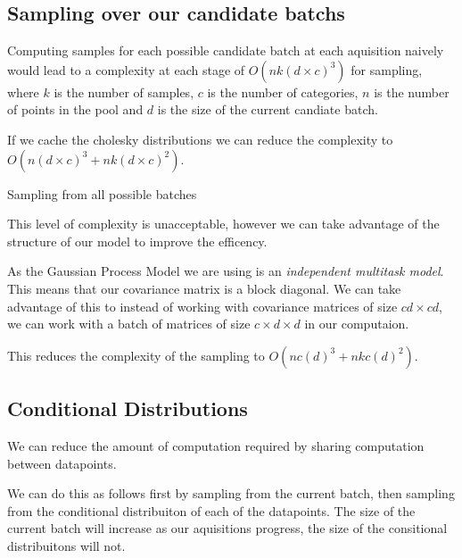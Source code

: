 \documentclass[12pt, a4paper]{report}
\theoremstyle{definition}
\theoremstyle{definition}
\theoremstyle{definition}
\begin{document}
\subsection{Sampling over our candidate batchs}

Computing samples for each possible candidate batch at each aquisition naively would lead to a complexity at each stage of $O\left(n k (d \times c)^3 \right)$ for sampling, where $k$ is the number of samples, $c$ is the number of categories, $n$ is the number of points in the pool and $d$ is the size of the current candiate batch.

If we cache the cholesky distributions we can reduce the complexity to $O(n (d \times c)^3  + n k (d \times c)^2)$.

\begin{algorithm}[H]
    \SetAlgoLined
     \caption{Sampling from all possible batches}
\end{algorithm}

This level of complexity is unacceptable, however we can take advantage of the structure of our model to improve the efficency.

As the Gaussian Process Model we are using is an \textit{independent multitask model}. This means that our covariance matrix is a block diagonal. We can take advantage of this to instead of working with covariance matrices of size $ cd \times cd $, we can work with a batch of matrices of size $c \times d \times d$ in our computaion.


This reduces the complexity of the sampling to $O(n c (d)^3  + n k c (d)^2)$.

\subsection{Conditional Distributions}

We can reduce the amount of computation required by sharing computation between datapoints.

We can do this as follows first by sampling from the current batch, then sampling from the conditional distribuiton of each of the datapoints. The size of the current batch will increase as our aquisitions progress, the size of the consitional distribuitons will not.
\end{document}
